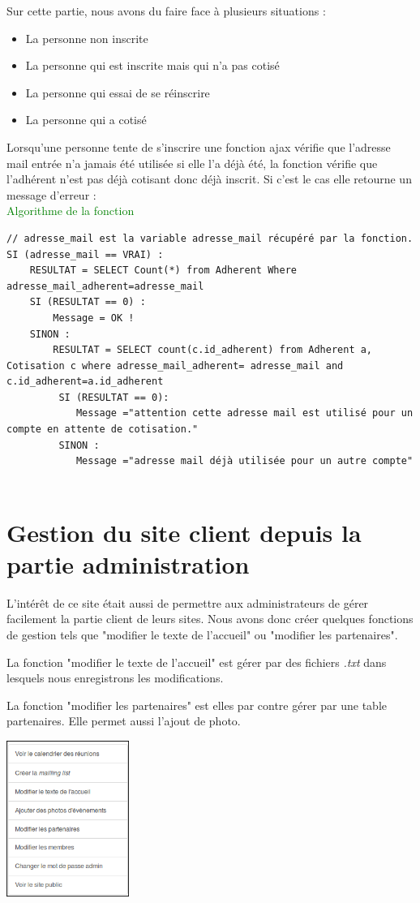 \documentclass[11pt,a4paper,titlepage]{report}
\begin{document}
Sur cette partie, nous avons du faire face à plusieurs situations : 
\begin{itemize}
\item La personne non inscrite
\item La personne qui est inscrite mais qui n'a pas cotisé
\item La personne qui essai de se réinscrire
\item La personne qui a cotisé
\end{itemize}

Lorsqu'une personne tente de s'inscrire une fonction ajax vérifie que l'adresse mail entrée n'a jamais été utilisée si elle l'a déjà été, la fonction vérifie que l'adhérent n'est pas déjà cotisant donc déjà inscrit. Si c'est le cas elle retourne un message d'erreur :
\\
\textcolor{green}{Algorithme de la fonction}
\begin{verbatim}
// adresse_mail est la variable adresse_mail récupéré par la fonction.
SI (adresse_mail == VRAI) :
	RESULTAT = SELECT Count(*) from Adherent Where    	adresse_mail_adherent=adresse_mail
	SI (RESULTAT == 0) :
		Message = OK ! 
	SINON :
		RESULTAT = SELECT count(c.id_adherent) from Adherent a, Cotisation c where adresse_mail_adherent= adresse_mail and c.id_adherent=a.id_adherent
		 SI (RESULTAT == 0):
			Message ="attention cette adresse mail est utilisé pour un compte en attente de cotisation." 
		 SINON :
			Message ="adresse mail déjà utilisée pour un autre compte"
		
\end{verbatim}


\section{Gestion du site client depuis la partie administration}
L'intérêt de ce site était aussi de permettre aux administrateurs de gérer facilement la partie client de leurs sites. Nous avons donc créer quelques fonctions de gestion tels que "modifier le texte de l'accueil" ou "modifier les partenaires". 

La fonction "modifier le texte de l'accueil" est gérer par des fichiers \textit{.txt} dans lesquels nous enregistrons les modifications.

La fonction "modifier les partenaires" est elles par contre gérer par une table partenaires. 
Elle permet aussi l'ajout de photo.

 

\begin{center}
\includegraphics[width=0.3\textwidth]{gestion.png}~
\end{center}
\end{document}
